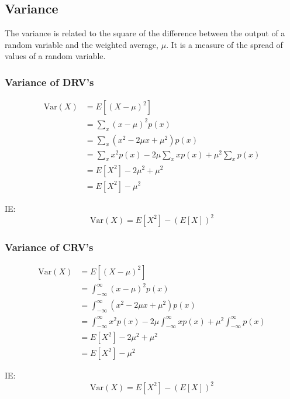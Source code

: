 \subsection{Variance}
The variance is related to the square of the difference between the output of a random variable and the weighted average, $\mu$. It is a measure of the spread of values of a random variable.
\begin{paracol}{2}[]
    \subsubsection{Variance of DRV's}
    \begin{equation*}
    \begin{aligned}
        \text{Var}(X) &= E[(X - \mu)^2] \\
        &= \sum_{x}(x - \mu)^2p(x) \\
        &= \sum_{x}(x^2 - 2 \mu x + \mu^2)p(x) \\
        &= \sum_{x}x^2p(x) - 2 \mu \sum_{x} xp(x) + \mu^2 \sum_{x}p(x) \\
        &= E[X^2]-2\mu^2+\mu^2 \\
        &= E[X^2]-\mu^2
    \end{aligned}
    \end{equation*}

    IE:
    \begin{equation*}
        \text{Var}(X) = E[X^2]-(E[X])^2
    \end{equation*}

    \syncallcounters
    \switchcolumn \subsubsection{Variance of CRV's}
    \begin{equation*}
    \begin{aligned}
        \text{Var}(X) &= E[(X - \mu)^2] \\
                      &= \int_{-\infty}^{\infty}(x - \mu)^2p(x) \\
                      &= \int_{-\infty}^{\infty}(x^2 - 2 \mu x + \mu^2)p(x) \\
                      &= \int_{-\infty}^{\infty}x^2p(x) - 2 \mu \int_{-\infty}^{\infty} xp(x) + \mu^2 \int_{-\infty}^{\infty}p(x) \\
                      &= E[X^2]-2\mu^2+\mu^2 \\
                      &= E[X^2]-\mu^2
    \end{aligned}
    \end{equation*}

    IE:
    \begin{equation*}
        \text{Var}(X) = E[X^2]-(E[X])^2
    \end{equation*}

\end{paracol}


